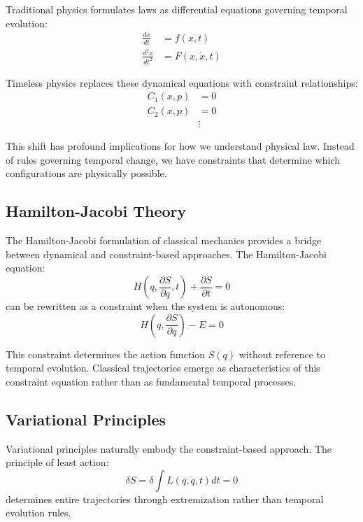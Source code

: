 \documentclass[12pt]{article}
\begin{document}
Traditional physics formulates laws as differential equations governing temporal evolution:
\begin{align}
\frac{dx}{dt} &= f(x,t) \\
\frac{d^2x}{dt^2} &= F(x,\dot{x},t)
\end{align}

Timeless physics replaces these dynamical equations with constraint relationships:
\begin{align}
C_1(x,p) &= 0 \\
C_2(x,p) &= 0 \\
&\vdots
\end{align}

This shift has profound implications for how we understand physical law. Instead of rules governing temporal change, we have constraints that determine which configurations are physically possible.

\subsection{Hamilton-Jacobi Theory}

The Hamilton-Jacobi formulation of classical mechanics provides a bridge between dynamical and constraint-based approaches. The Hamilton-Jacobi equation:
\begin{equation}
H\left(q,\frac{\partial S}{\partial q},t\right) + \frac{\partial S}{\partial t} = 0
\end{equation}
can be rewritten as a constraint when the system is autonomous:
\begin{equation}
H\left(q,\frac{\partial S}{\partial q}\right) - E = 0
\end{equation}

This constraint determines the action function $S(q)$ without reference to temporal evolution. Classical trajectories emerge as characteristics of this constraint equation rather than as fundamental temporal processes.

\subsection{Variational Principles}

Variational principles naturally embody the constraint-based approach. The principle of least action:
\begin{equation}
\delta S = \delta\int L(q,\dot{q},t)dt = 0
\end{equation}
determines entire trajectories through extremization rather than temporal evolution rules.
\end{document}
